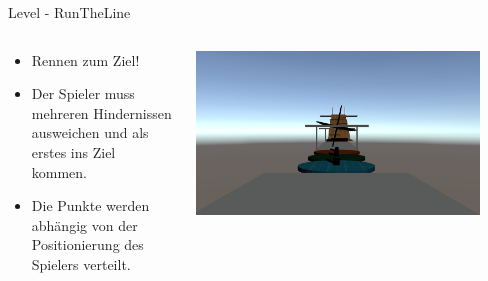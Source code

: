 \documentclass[xcolor=dvipsnames]{beamer}
\begin{document}
\begin{frame}{Level - RunTheLine}
\begin{columns}
\begin{column}{0.5\textwidth}
	\begin{itemize}
		\item Rennen zum Ziel!
		\item Der Spieler muss mehreren Hindernissen ausweichen und als erstes ins Ziel kommen.
		\item Die Punkte werden abhängig von der Positionierung des Spielers verteilt.
	\end{itemize}
\end{column}
\begin{column}{0.5\textwidth} 
	\begin{center}
		\includegraphics[width=0.9\textwidth]{runthelinpic.png}
	\end{center}
\end{column}
\end{columns}

\end{frame}
\end{document}
